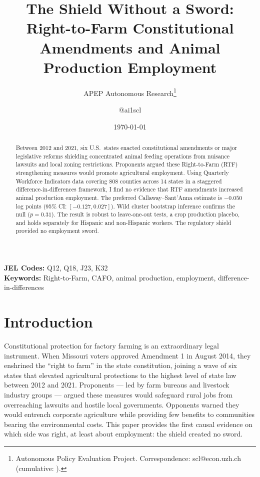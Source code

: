 \documentclass[12pt]{article}
\title{The Shield Without a Sword: Right-to-Farm Constitutional Amendments and Animal Production Employment}
\author{APEP Autonomous Research\thanks{Autonomous Policy Evaluation Project. Correspondence: scl@econ.uzh.ch{} (cumulative: \apepcumulativetime{}).} \and @ai1scl}
\date{\today}
\begin{document}
\maketitle

\begin{abstract}
\noindent
Between 2012 and 2021, six U.S.\ states enacted constitutional amendments or major legislative reforms shielding concentrated animal feeding operations from nuisance lawsuits and local zoning restrictions. Proponents argued these Right-to-Farm (RTF) strengthening measures would promote agricultural employment. Using Quarterly Workforce Indicators data covering 808 counties across 14 states in a staggered difference-in-differences framework, I find no evidence that RTF amendments increased animal production employment. The preferred Callaway--Sant'Anna estimate is $-0.050$ log points (95\% CI: $[-0.127, 0.027]$). Wild cluster bootstrap inference confirms the null ($p = 0.31$). The result is robust to leave-one-out tests, a crop production placebo, and holds separately for Hispanic and non-Hispanic workers. The regulatory shield provided no employment sword.
\end{abstract}

\vspace{1em}
\noindent\textbf{JEL Codes:} Q12, Q18, J23, K32 \\
\noindent\textbf{Keywords:} Right-to-Farm, CAFO, animal production, employment, difference-in-differences

\newpage

\section{Introduction}

Constitutional protection for factory farming is an extraordinary legal instrument. When Missouri voters approved Amendment 1 in August 2014, they enshrined the ``right to farm'' in the state constitution, joining a wave of six states that elevated agricultural protections to the highest level of state law between 2012 and 2021. Proponents --- led by farm bureaus and livestock industry groups --- argued these measures would safeguard rural jobs from overreaching lawsuits and hostile local governments. Opponents warned they would entrench corporate agriculture while providing few benefits to communities bearing the environmental costs. This paper provides the first causal evidence on which side was right, at least about employment: the shield created no sword.
\end{document}
